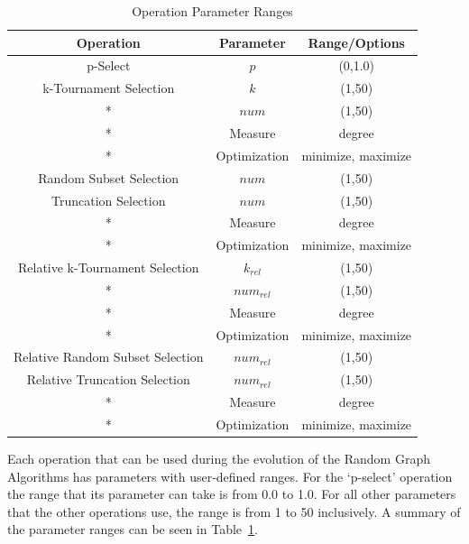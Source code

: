 \documentclass{article}
\begin{document}
\begin{table}
    \begin{center}
    

    \begin{tabular}{|c|c|c|}
        \hline
        \textbf{Operation} &\textbf{Parameter}&\textbf{Range/Options}\\ \hline
        p-Select & $p$ & (0,1.0)\\ \hline \hline
        k-Tournament Selection & $k$ & (1,50) \\ \hline
        * & $num$ & (1,50)\\ \hline
        * & Measure & degree \\ \hline
        * & Optimization & minimize, maximize \\ \hline \hline
        Random Subset Selection & $num$ & (1,50) \\ \hline \hline
        Truncation Selection & $num$ & (1,50) \\ \hline
        * & Measure & degree \\ \hline
        * & Optimization & minimize, maximize \\ \hline \hline

        Relative k-Tournament Selection & $k_{rel}$ & (1,50) \\ \hline
        * & $num_{rel}$ & (1,50)\\ \hline
        * & Measure & degree \\ \hline
        * & Optimization & minimize, maximize \\ \hline \hline
        Relative Random Subset Selection & $num_{rel}$ & (1,50) \\ \hline \hline
        Relative Truncation Selection & $num_{rel}$ & (1,50) \\ \hline
        * & Measure & degree \\ \hline
        * & Optimization & minimize, maximize \\ \hline

    \end{tabular}
    \end{center}
\caption{Operation Parameter Ranges}
    \label{tab:op}
\end{table}

Each operation that can be used during the evolution of the Random Graph Algorithms has parameters with user-defined ranges. For the `p-select' operation
the range that its parameter can take is from 0.0 to 1.0. For all other parameters that the other operations use, the range is from 1 to 50 inclusively.
A summary of the parameter ranges can be seen in Table~\ref{tab:op}.
\end{document}
